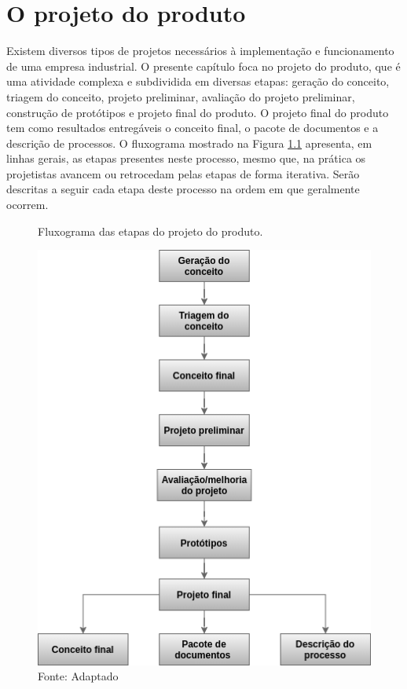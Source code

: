 \chapter{O projeto do produto}
\label{chap:projeto_do_produto}

Existem diversos tipos de projetos necessários à implementação e funcionamento de uma empresa industrial. O presente capítulo foca no projeto do produto, que é uma atividade complexa e subdividida em diversas etapas: geração do conceito, triagem do conceito, projeto preliminar, avaliação do projeto preliminar, construção de protótipos e projeto final do produto.  O projeto final do produto tem como resultados entregáveis o conceito final, o pacote de documentos e a descrição de processos. O fluxograma mostrado na Figura \ref{fig:projeto_produto} apresenta, em linhas gerais, as etapas presentes neste processo, mesmo que, na prática os projetistas avancem ou retrocedam pelas etapas de forma iterativa. Serão descritas a seguir cada etapa deste processo na ordem em que geralmente ocorrem.

\begin{figure}[H]
  \centering
  \caption{Fluxograma das etapas do projeto do produto.}
  \includegraphics[width=1\textwidth]{images/projeto_produto.png}
  \caption*{Fonte: Adaptado \cite{slack2006administracao} }
  \label{fig:projeto_produto}
\end{figure}


